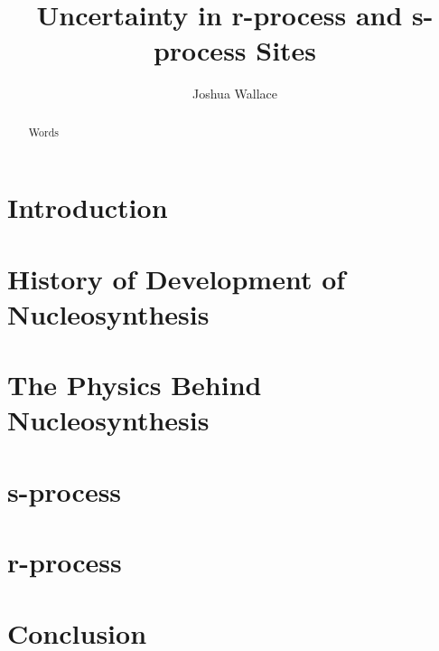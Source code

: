 \documentclass{emulateapj}
\begin{document}
\title{Uncertainty in r-process and s-process Sites}

\author{Joshua Wallace}

\begin{abstract}
Words
\end{abstract}


\section{Introduction}


\section{History of Development of Nucleosynthesis}


\section{The Physics Behind Nucleosynthesis}


\section{s-process}



\section{r-process}



\section{Conclusion}



\end{document}
